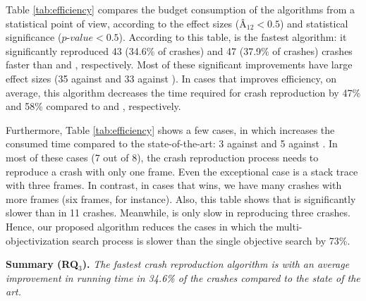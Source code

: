 Table \ref{tab:efficiency} compares the budget consumption of the algorithms from a statistical point of view, \ie according to the effect sizes ($\textit{\^{A}}_{12} < 0.5$) and statistical significance ($\textit{p-value} < 0.5$). According to this table, \moho is the fastest algorithm: it significantly reproduced 43 (34.6\% of crashes) and 47 (37.9\% of crashes) crashes faster than \SGGA and \decomposition, respectively. Most of these significant improvements have large effect sizes (35 against \SGGA and 33 against \decomposition). In cases that \moho improves efficiency, on average, this algorithm decreases the time required for crash reproduction by 47\% and 58\% compared to \decomposition and \SGGA, respectively. 

Furthermore, Table \ref{tab:efficiency} shows a few cases, in which \moho increases the consumed time compared to the state-of-the-art: 3 against \SGGA and 5 against \decomposition. In most of these cases (7 out of 8), the crash reproduction process needs to reproduce a crash with only one frame. Even the exceptional case is a stack trace with three frames. In contrast, in cases that \moho wins, we have many crashes with more frames (six frames, for instance). Also, this table shows that \decomposition is significantly slower than \SGGA  in 11 crashes. Meanwhile, \moho is only slow in reproducing three crashes.
Hence, our proposed algorithm reduces the cases in which the multi-objectivization search process is slower than the single objective search by 73\%.


\textbf{Summary (RQ$_3$). }
\textit{The fastest crash reproduction algorithm is \moho with an average improvement in running time in 34.6\% of the crashes compared to the state of the art.
}



